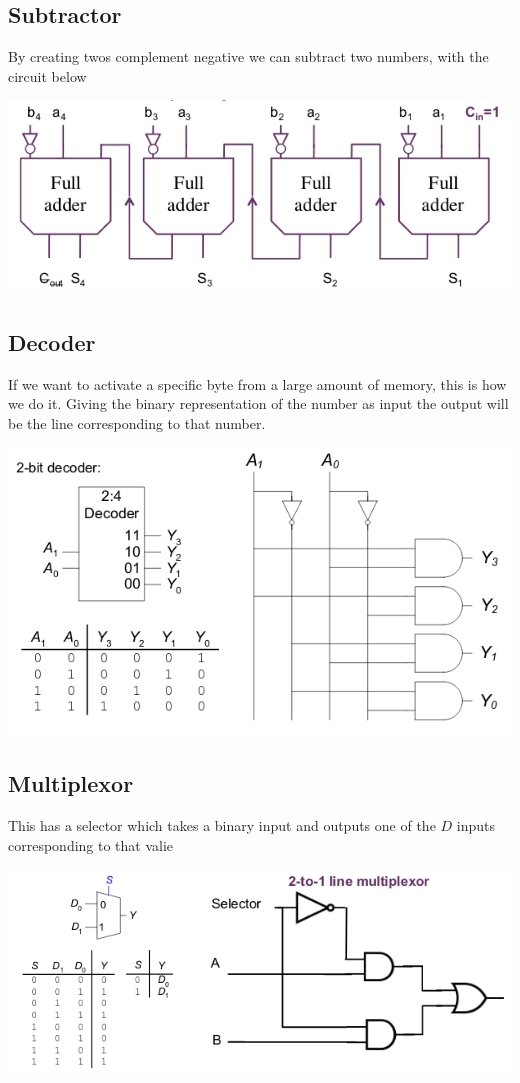 \documentclass{article}[18pt]
\begin{document}
\subsection{Subtractor}
By creating twos complement negative we can subtract two numbers, with the circuit below
\begin{center}
	\includegraphics[scale=0.7]{Subtractor}
\end{center}
\subsection{Decoder}
If we want to activate a specific byte from a large amount of memory, this is how we do it. Giving the binary representation of the number as input the output will be the line corresponding to that number.
\begin{center}
	\includegraphics[scale=0.7]{Decoder}
\end{center}
\subsection{Multiplexor}
This has a selector which takes a binary input and outputs one of the $D$ inputs corresponding to that valie
\begin{center}
	\includegraphics[scale=0.7]{Mux}
\end{center}
\end{document}
